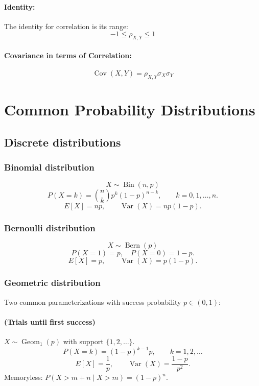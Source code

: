 \documentclass[12pt]{article}
\begin{document}
\paragraph{Identity:}
The identity for correlation is its range:
\[
-1 \leq \rho_{X,Y} \leq 1
\]
\paragraph{Covariance in terms of Correlation:}
\[
\operatorname{Cov}(X,Y) = \rho_{X,Y} \sigma_X \sigma_Y
\]

\section{Common Probability Distributions}

\subsection{Discrete distributions}

\subsubsection*{Binomial distribution}
\[
X \sim \operatorname{Bin}(n,p)
\]
\[
P(X = k) = \binom{n}{k} p^k (1-p)^{n-k}, \qquad k = 0,1,\dots,n.
\]
\[
E[X] = np, \qquad \operatorname{Var}(X) = np(1-p).
\]

\subsubsection*{Bernoulli distribution}
\[
X \sim \operatorname{Bern}(p)
\]
\[
P(X = 1) = p, \quad P(X = 0) = 1 - p.
\]
\[
E[X] = p, \qquad \operatorname{Var}(X) = p(1-p).
\]

\subsubsection*{Geometric distribution}
Two common parameterizations with success probability $p\in(0,1)$:

\paragraph{(Trials until first success) } 
$X \sim \operatorname{Geom}_1(p)$ with support $\{1,2,\ldots\}$.
\[
P(X=k)=(1-p)^{k-1}p,\qquad k=1,2,\ldots
\]
\[
E[X]=\frac{1}{p},\qquad \operatorname{Var}(X)=\frac{1-p}{p^{2}}.
\]
Memoryless: $P(X>m+n\mid X>m)=(1-p)^n$.
\end{document}
